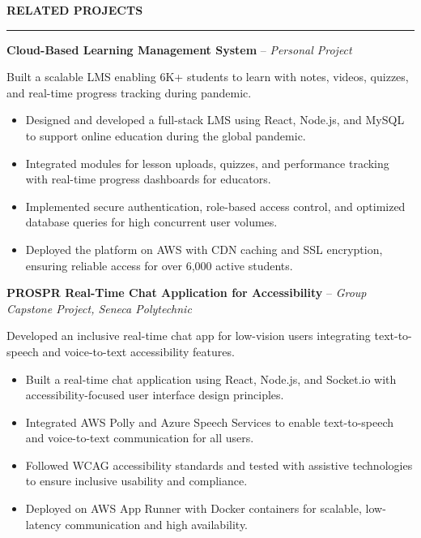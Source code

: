 \documentclass[10pt,letterpaper]{article}
\begin{document}
\vspace{6pt}

\textbf{RELATED PROJECTS}\\[-8pt]
\noindent\rule{\textwidth}{1pt}

\vspace{-2pt}

\textbf{Cloud-Based Learning Management System} -- \emph{Personal Project}

\vspace{-1pt}

Built a scalable LMS enabling 6K+ students to learn with notes, videos, quizzes, and real-time progress tracking during pandemic.
\vspace{-1pt}
\begin{itemize}
\item Designed and developed a full-stack LMS using React, Node.js, and MySQL to support online education during the global pandemic.
\item Integrated modules for lesson uploads, quizzes, and performance tracking with real-time progress dashboards for educators.
\item Implemented secure authentication, role-based access control, and optimized database queries for high concurrent user volumes.
\item Deployed the platform on AWS with CDN caching and SSL encryption, ensuring reliable access for over 6,000 active students.
\end{itemize}

\textbf{PROSPR  Real-Time Chat Application for Accessibility} -- \emph{Group Capstone Project, Seneca Polytechnic }

\vspace{-1pt}

Developed an inclusive real-time chat app for low-vision users integrating text-to-speech and voice-to-text accessibility features.
\vspace{-1pt}
\begin{itemize}
\item Built a real-time chat application using React, Node.js, and Socket.io with accessibility-focused user interface design principles.
\item Integrated AWS Polly and Azure Speech Services to enable text-to-speech and voice-to-text communication for all users.
\item Followed WCAG accessibility standards and tested with assistive technologies to ensure inclusive usability and compliance.
\item Deployed on AWS App Runner with Docker containers for scalable, low-latency communication and high availability.
\end{itemize}
\end{document}
